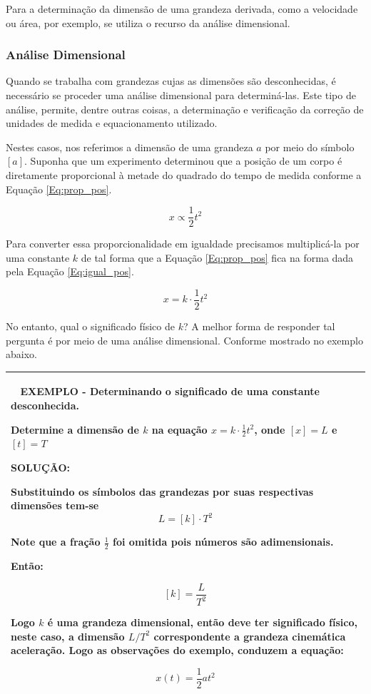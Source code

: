 \documentclass[a4paper, 11pt]{report}
\newenvironment{myboxed}
    {
        \begin{center}
        \begin{tabular}{p{0.7\textwidth}}
        \hline\
    }
    { 
        \\\hline
        \end{tabular} 
        \end{center}
    }
\begin{document}
Para a determinação da dimensão de uma grandeza derivada, como a velocidade ou 
área, por exemplo, se utiliza o recurso da análise dimensional. 

\subsubsection{Análise Dimensional}
Quando se trabalha com grandezas cujas as dimensões são desconhecidas, é
necessário se proceder uma análise dimensional para determiná-las. Este tipo de 
análise, permite, dentre outras coisas, a determinação e verificação da correção
de unidades de medida e equacionamento utilizado. 

Nestes casos, nos referimos a dimensão de uma grandeza $a$ por meio do símbolo
$[a]$. Suponha que um experimento determinou que a posição de um corpo é 
diretamente proporcional à metade do quadrado do tempo de medida conforme a 
Equação \ref{Eq:prop_pos}.

\begin{equation}
    x \propto \frac{1}{2} t^2
    \label{Eq:prop_pos}
\end{equation}

Para converter essa proporcionalidade em igualdade precisamos multiplicá-la por 
uma constante $k$ de tal forma que a Equação \ref{Eq:prop_pos} fica na forma 
dada pela Equação \ref{Eq:igual_pos}.

\begin{equation}
    x = k \cdot \frac{1}{2} t^2
    \label{Eq:igual_pos}
\end{equation}

No entanto, qual o significado físico de $k$? A melhor forma de responder tal 
pergunta é por meio de uma análise dimensional. Conforme mostrado no exemplo 
abaixo. 

\begin{myboxed}
    \textbf{EXEMPLO - Determinando o significado de uma constante desconhecida.}

    Determine a dimensão de $k$ na equação $x = k \cdot \frac{1}{2} t^2$, 
    onde $[x] = L$ e $[t] = T$

    \textbf{SOLUÇÃO:}

    Substituindo os símbolos das grandezas por suas respectivas dimensões tem-se
    $$
        L = [k] \cdot T^2
    $$
    
    Note que a fração $\frac{1}{2}$ foi omitida pois números são adimensionais. 

    Então:

    $$
        [k] = \frac{L}{T^2}
    $$

    Logo $k$ é uma grandeza dimensional, então deve ter significado físico, 
    neste caso, a dimensão $L/T^2$ correspondente a grandeza cinemática 
    aceleração. Logo as observações do exemplo, conduzem a equação:

    $$
        x(t) = \frac{1}{2} a t^2
    $$
\end{myboxed}
\end{document}
